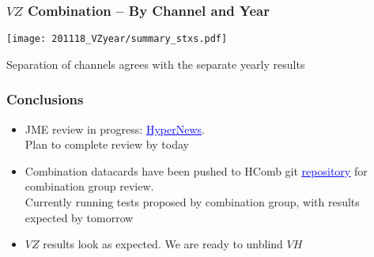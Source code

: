 \documentclass{beamer}
\newcommand{\beginbackup}{
  \newcounter{framenumbervorappendix}
  \setcounter{framenumbervorappendix}{\value{framenumber}}
}
\newcommand{\backupend}{
  \addtocounter{framenumbervorappendix}{-\value{framenumber}}
  \addtocounter{framenumber}{\value{framenumbervorappendix}}
}
\newcommand{\link}[2]{\href{#2}{\textcolor{blue}{\underline{#1}}}}
\begin{document}
\begin{frame}
  \frametitle{$V\!Z$ Combination -- By Channel and Year}

  \begin{center}
  \texttt{[image: 201118\_VZyear/summary\_stxs.pdf]}
  \end{center}

  Separation of channels agrees with the separate yearly results

\end{frame}

\begin{frame}
  \frametitle{Conclusions}

  \begin{itemize}
  \item JME review in progress: \link{HyperNews}{https://hypernews.cern.ch/HyperNews/CMS/get/HIG-20-001/7/1.html}. \\
    Plan to complete review by today
  \item Combination datacards have been pushed to HComb git \link{repository}{https://gitlab.cern.ch/cms-hcg/cadi/hig-20-001} for combination group review. \\
    Currently running tests proposed by combination group, with results expected by tomorrow
  \item $V\!Z$ results look as expected. We are ready to unblind $V\!H$
  \end{itemize}

\end{frame}

\begin{comment}
\beginbackup

\begin{frame}
  \centering
    {\Huge \bf\sffamily Backup Slides}
\end{frame}

\begin{frame}
  \frametitle{Impacts}

  \texttt{[image: impacts\_out.pdf]}

\end{frame}

\begin{frame}
  \frametitle{Impacts}

  \texttt{[image: impacts\_out.pdf]}

\end{frame}

\backupend
\end{comment}
\end{document}
